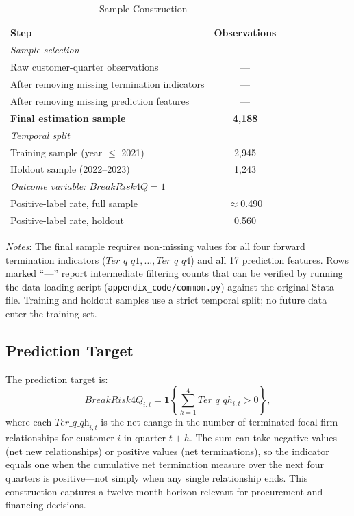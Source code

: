 \documentclass[12pt]{article}
\begin{document}
\begin{table}[H]
\centering
\caption{Sample Construction}\label{tab:sample_construction}
\begin{threeparttable}
\small
\begin{tabular}{lc}
\toprule
Step & Observations \\
\midrule
\multicolumn{2}{l}{\textit{Sample selection}} \\
\quad Raw customer-quarter observations & --- \\
\quad After removing missing termination indicators & --- \\
\quad After removing missing prediction features & --- \\
\quad \textbf{Final estimation sample} & \textbf{4,188} \\
\midrule
\multicolumn{2}{l}{\textit{Temporal split}} \\
\quad Training sample (year $\leq$ 2021) & 2,945 \\
\quad Holdout sample (2022--2023) & 1,243 \\
\midrule
\multicolumn{2}{l}{\textit{Outcome variable: $\textit{BreakRisk4Q}=1$}} \\
\quad Positive-label rate, full sample & $\approx$0.490 \\
\quad Positive-label rate, holdout & 0.560 \\
\bottomrule
\end{tabular}
\begin{tablenotes}
  \small
  \item \textit{Notes}: The final sample requires non-missing values for
  all four forward termination indicators
  ($\textit{Ter\_q\_q1}, \ldots, \textit{Ter\_q\_q4}$) and all 17
  prediction features.  Rows marked ``---'' report intermediate filtering
  counts that can be verified by running the data-loading script
  (\texttt{appendix\_code/common.py}) against the original Stata file.
  Training and holdout samples use a strict temporal split; no future data
  enter the training set.
\end{tablenotes}
\end{threeparttable}
\end{table}

\subsection{Prediction Target}

The prediction target is:
\begin{equation}
\textit{BreakRisk4Q}_{i,t}
= \mathbf{1}\!\left\{
    \sum_{h=1}^{4} \textit{Ter\_q\_q}h_{i,t} > 0
  \right\},
\label{eq:target}
\end{equation}
where each $\textit{Ter\_q\_qh}_{i,t}$ is the net change in the number of
terminated focal-firm relationships for customer $i$ in quarter $t+h$.
The sum can take negative values (net new relationships) or positive values
(net terminations), so the indicator equals one when the cumulative net
termination measure over the next four quarters is positive---not simply
when any single relationship ends.  This construction captures a twelve-month
horizon relevant for procurement and financing decisions.
\end{document}
